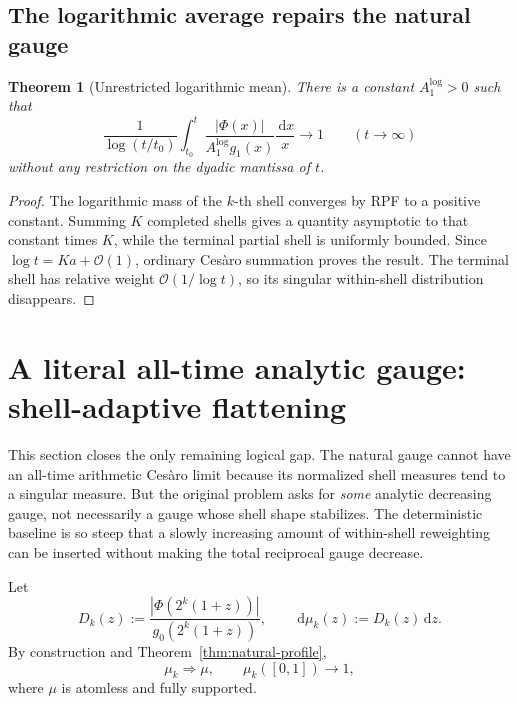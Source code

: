 \documentclass[11pt]{article}
\newtheorem{theorem}{Theorem}[section]
\theoremstyle{definition}
\theoremstyle{remark}
\newcommand{\dd}{\,\mathrm d}
\newcommand{\bigO}{\mathcal O}
\begin{document}
\subsection{The logarithmic average repairs the natural gauge}

\begin{theorem}[Unrestricted logarithmic mean]
\label{thm:logmean}
There is a constant \(A_1^{\log}>0\) such that
\begin{equation}
 \frac1{\log(t/t_0)}\int_{t_0}^{t}
 \frac{|\Phi(x)|}{A_1^{\log}g_1(x)}\frac{\dd x}{x}
 \longrightarrow1
 \qquad(t\to\infty)
 \label{eq:logmean}
\end{equation}
without any restriction on the dyadic mantissa of \(t\).
\end{theorem}

\begin{proof}
The logarithmic mass of the \(k\)-th shell converges by RPF to a positive
constant.  Summing \(K\) completed shells gives a quantity asymptotic to that
constant times \(K\), while the terminal partial shell is uniformly bounded.
Since \(\log t=Ka+\bigO(1)\), ordinary Ces\`aro summation proves the result.
The terminal shell has relative weight \(\bigO(1/\log t)\), so its singular
within-shell distribution disappears.
\end{proof}

\section{A literal all-time analytic gauge: shell-adaptive flattening}
\label{sec:adaptive}

This section closes the only remaining logical gap.  The natural gauge cannot
have an all-time arithmetic Ces\`aro limit because its normalized shell
measures tend to a singular measure.  But the original problem asks for
\emph{some} analytic decreasing gauge, not necessarily a gauge whose shell
shape stabilizes.  The deterministic baseline is so steep that a slowly
increasing amount of within-shell reweighting can be inserted without making
the total reciprocal gauge decrease.

Let
\begin{equation}
 D_k(z):=\frac{|\Phi(2^k(1+z))|}{g_0(2^k(1+z))},
 \qquad
 \dd\mu_k(z):=D_k(z)\dd z.
 \label{eq:muk}
\end{equation}
By construction and Theorem~\ref{thm:natural-profile},
\begin{equation}
 \mu_k\Longrightarrow\mu,
 \qquad \mu_k([0,1])\longrightarrow1,
 \label{eq:muk-conv}
\end{equation}
where \(\mu\) is atomless and fully supported.
\end{document}
